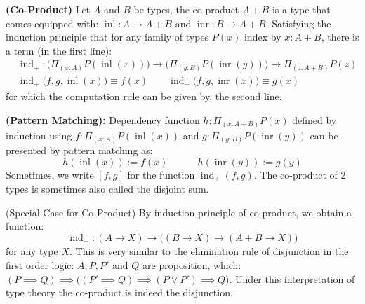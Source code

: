 \begin{definition}{\textbf{(Co-Product)}}
    Let $A$ and $B$ be types, the co-product $A+B$ is a type that comes equipped with: $\operatorname{inl}:A\rightarrow A+B$ and $\operatorname{inr}:B\rightarrow A+B$. Satisfying the induction principle that for any family of types $P(x)$ index by $x:A+B$, there is a term (in the first line):
    \begin{equation*}
    \begin{aligned}
        &\operatorname{ind}_+ : \Big( \Pi_{(x:A)}P(\operatorname{inl}(x)) \Big) \rightarrow \Big( \Pi_{(y:B)}P(\operatorname{inr}(y)) \Big) \rightarrow \Pi_{(z:A+B)}P(z) \\
        &\operatorname{ind}_+ \big( f,g,\operatorname{inl}(x) \big) \equiv f(x) \qquad \operatorname{ind}_+ \big( f,g,\operatorname{inr}(x) \big)\equiv g(x)
    \end{aligned}
    \end{equation*}
    for which the computation rule can be given by, the second line. 
    
    \textbf{(Pattern Matching):} Dependency function $h:\Pi_{(x:A+B)}P(x)$ defined by induction using $f:\Pi_{(x:A)}P(\operatorname{inl}(x))$ and $g:\Pi_{(y:B)}P(\operatorname{inr}(y))$ can be presented by pattern matching as:
    \begin{equation*}
        h(\operatorname{inl}(x)) := f(x) \qquad \quad h(\operatorname{inr}(y)):=g(y)
    \end{equation*}
    Sometimes, we write $[f,g]$ for the function $\operatorname{ind} _+(f,g)$. The co-product of 2 types is sometimes also called the disjoint sum. 
\end{definition}

\begin{remark}{(Special Case for Co-Product)}
    By induction principle of co-product, we obtain a function:
    \begin{equation*}
        \operatorname{ind}_+:(A\rightarrow X)\rightarrow\big((B\rightarrow X)\rightarrow (A+B\rightarrow X)\big)
    \end{equation*}
    for any type $X$. This is very similar to the elimination rule of disjunction in the first order logic: $A,P,P'$ and $Q$ are proposition, which: $(P\implies Q) \implies \big( (P'\implies Q)\implies (P\vee P')\implies Q \big)$. Under this interpretation of type theory the co-product is indeed the disjunction.
\end{remark}

